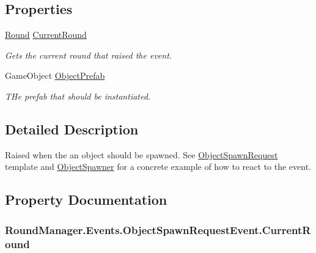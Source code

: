 \subsection*{Properties}
\begin{DoxyCompactItemize}
\item 
\hyperlink{class_round_manager_1_1_round}{Round} \hyperlink{class_round_manager_1_1_events_1_1_object_spawn_request_event_af899ff20e137b7809be2cf919960ceea}{Current\+Round}
\begin{DoxyCompactList}\small\item\em Gets the current round that raised the event. \end{DoxyCompactList}\item 
Game\+Object \hyperlink{class_round_manager_1_1_events_1_1_object_spawn_request_event_a8a95244117fcfc697e4299c73dffea64}{Object\+Prefab}
\begin{DoxyCompactList}\small\item\em T\+He prefab that should be instantiated. \end{DoxyCompactList}\end{DoxyCompactItemize}


\subsection{Detailed Description}
Raised when the an object should be spawned. See \hyperlink{class_round_manager_1_1_object_spawn_request}{Object\+Spawn\+Request} template and \hyperlink{class_round_manager_1_1_object_spawner}{Object\+Spawner} for a concrete example of how to react to the event. 



\subsection{Property Documentation}
\hypertarget{class_round_manager_1_1_events_1_1_object_spawn_request_event_af899ff20e137b7809be2cf919960ceea}{}
\subsubsection[{Current\+Round}]{ Round\+Manager.\+Events.\+Object\+Spawn\+Request\+Event.\+Current\+Round\hspace{0.3cm}{\ttfamily [get]}}\label{class_round_manager_1_1_events_1_1_object_spawn_request_event_af899ff20e137b7809be2cf919960ceea}


